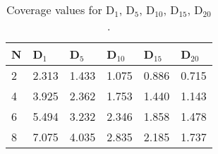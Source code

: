 \begin{table}[t!]
	\small
	\caption{Coverage values for D$_{1}$, D$_{5}$, D$_{10}$, D$_{15}$, D$_{20}$.}
	\begin{tabular}{|l|p{0.86cm}|p{0.86cm}|p{0.86cm}|p{0.86cm}|p{0.86cm}|}
		\hline
		
\textbf{N} & \textbf{ D$_{1}$} & \textbf{D$_{5}$} & \textbf{ D$_{10}$} & \textbf{D$_{15}$} & \textbf{D$_{20}$} \\ \hline
		2                & 2.313                                                                    & 1.433                                                                    & 1.075                                                                     & 0.886                                                                     & 0.715                                                                     \\ \hline
		4                & 3.925                                                                    & 2.362                                                                    & 1.753                                                                     & 1.440                                                                     & 1.143                                                                     \\ \hline
		6                & 5.494                                                                    & 3.232                                                                    & 2.346                                                                     & 1.858                                                                     & 1.478                                                                     \\ \hline
		8                & 7.075                                                                    & 4.035                                                                    & 2.835                                                                     & 2.185                                                                     & 1.737                                                                     \\ \hline

\end{tabular}
\end{table}
